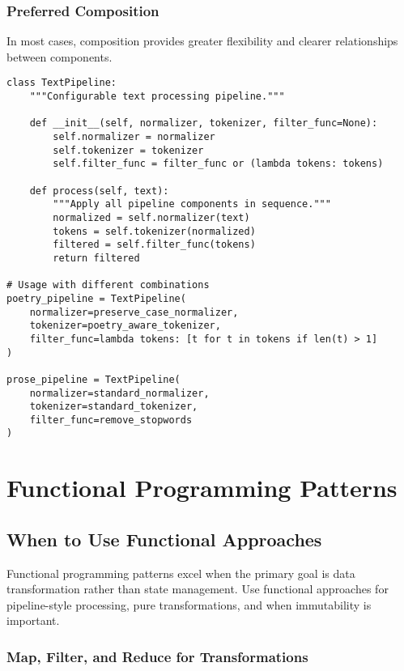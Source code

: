 \documentclass[11pt,a4paper]{article}
\begin{document}
\subsubsection{Preferred Composition}

In most cases, composition provides greater flexibility and clearer relationships between components.

\begin{lstlisting}[caption=Composition for flexible design]
class TextPipeline:
    """Configurable text processing pipeline."""
    
    def __init__(self, normalizer, tokenizer, filter_func=None):
        self.normalizer = normalizer
        self.tokenizer = tokenizer
        self.filter_func = filter_func or (lambda tokens: tokens)
    
    def process(self, text):
        """Apply all pipeline components in sequence."""
        normalized = self.normalizer(text)
        tokens = self.tokenizer(normalized)
        filtered = self.filter_func(tokens)
        return filtered

# Usage with different combinations
poetry_pipeline = TextPipeline(
    normalizer=preserve_case_normalizer,
    tokenizer=poetry_aware_tokenizer,
    filter_func=lambda tokens: [t for t in tokens if len(t) > 1]
)

prose_pipeline = TextPipeline(
    normalizer=standard_normalizer,
    tokenizer=standard_tokenizer,
    filter_func=remove_stopwords
)
\end{lstlisting}

\section{Functional Programming Patterns}

\subsection{When to Use Functional Approaches}

Functional programming patterns excel when the primary goal is data transformation rather than state management. Use functional approaches for pipeline-style processing, pure transformations, and when immutability is important.

\subsubsection{Map, Filter, and Reduce for Transformations}
\end{document}
